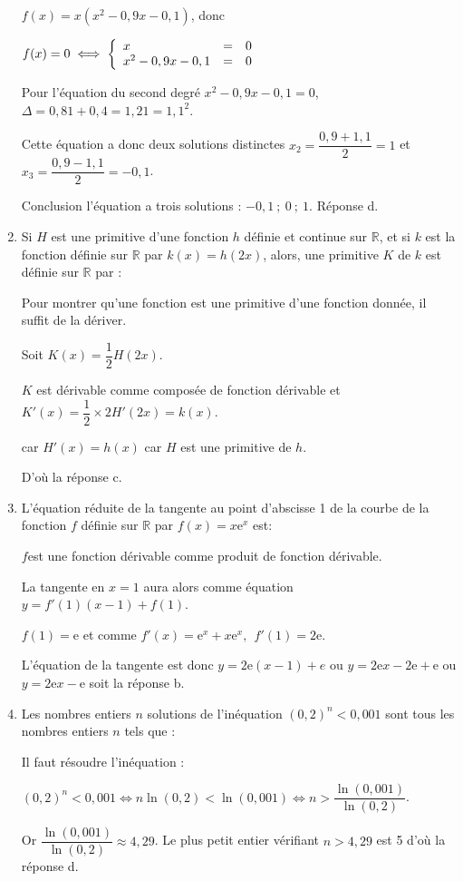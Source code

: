 \documentclass[11pt]{article}
\newcommand{\R}{\mathbb{R}}
\newcommand{\e}{\text{e}}
\begin{document}
\begin{enumerate}
$f(x) = x\left(x^2 - 0,9x - 0,1 \right)$, donc 

$f(x) = 0 \iff \left\{\begin{array}{l c l}
x&=&0\\
x^2  - 0,9 x - 0,1&=&0
\end{array}\right.$

Pour l'équation du second degré $x^2  - 0,9 x - 0,1 = 0$, $\Delta = 0,81 + 0,4 = 1,21 = 1,1^2$.

Cette équation a donc deux solutions distinctes $x_2 = \dfrac{0,9 + 1,1}{2} = 1$ et $x_3 = \dfrac{0,9 - 1,1}{2} = - 0,1$.

Conclusion l'équation a trois solutions : $- 0,1\: ;\: 0\: ;\: 1$. Réponse d.
\item Si $H$ est une primitive d'une fonction $h$ définie et continue sur $\R$, 
et si $k$ est la fonction définie sur $\R$ par $k(x) = h(2x)$, 
alors, une primitive $K$ de $k$ est définie sur $\R$ par :

Pour montrer qu'une fonction est une primitive d'une fonction donnée,  il suffit de la dériver.

Soit $K(x)=\dfrac{1}{2}H(2x)$.

$K$ est dérivable comme composée de fonction dérivable et $K'(x)=\dfrac{1}{2}\times 2H'(2x)=k(x)$.

car $H'(x)=h(x)$ car $H$ est une primitive de $h$.

D'où la réponse c.

\item L'équation réduite de la tangente au point d'abscisse 1 de la courbe de la fonction $f$ définie sur $\R$ par $f(x) = x\text{e}^x$ est:


$f$est une fonction dérivable comme produit de fonction dérivable.

La tangente en $x=1$ aura alors comme équation $y=f'(1)(x-1)+f(1)$.

$f(1)=\e$ et comme $f'(x) = \text{e}^x + x\text{e}^x, \: \:f'(1) = 2\text{e}$.

L'équation de la tangente est donc $y=2\e(x - 1) + e$ ou $y = 2\e x - 2\e + \e$ ou $y = 2\e x - \e$ soit la réponse b.
\item Les nombres entiers $n$ solutions de l'inéquation $(0,2)^n < 0,001$ sont tous les
nombres entiers $n$ tels que :

Il faut résoudre l'inéquation :

$(0,2)^n < 0,001 \iff n\ln(0,2)<\ln(0,001) \iff n>\dfrac{\ln(0,001)}{\ln(0,2)}$.

Or $\dfrac{\ln(0,001)}{\ln(0,2)} \approx 4,29$. Le plus petit entier vérifiant $n > 4,29$ est 5 d'où la réponse d.
\end{enumerate}
\end{document}
